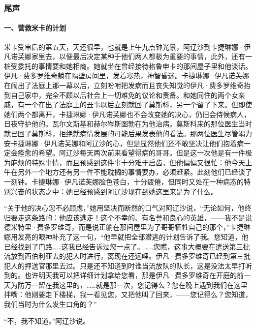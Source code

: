 \subsubsection*{尾声}

\paragraph*{一、营救米卡的计划}
\par 米卡受审后的第五天，天还很早，也就是上午九点钟光景，阿辽沙到卡捷琳娜·伊凡诺芙娜家里去，以便最后决定某种于他们两人都极为重要的事情，此外，还有一桩受委托的事情要和她相商。她就坐在曾经接待格鲁申卡的那间屋子里和他谈话。伊凡·费多罗维奇躺在隔壁房间里，发着寒热，神智昏迷。卡捷琳娜·伊凡诺芙娜在闹出了法庭上那一幕以后，立刻吩咐把发病而且丧失知觉的伊凡·费多罗维奇抬到自己家中，完全不顾以后社会上一切难免的议论和责备。和她同住的两个女亲戚，有一个在出了法庭上的丑事以后立刻就回了莫斯科，另一个留了下来。但即使她们两个都离开，卡捷琳娜·伊凡诺芙娜也不会改变她的决心，仍旧会侍候病人，日夜守护他的。瓦尔文斯基和赫尔岑斯图勃在为他治病。莫斯科来的那位医生当时就已回了莫斯科，拒绝就病情发展的可能后果发表他的看法。那两位医生尽管竭力安卡捷琳娜·伊凡诺芙娜和阿辽沙的心，但是显然他们还不敢坚决让他们抱着病一定会痊愈的希望。阿辽沙每天两次前来看望得病的哥哥。但是这一次他是有一件极为麻烦的特殊事情，而且预感到这件事十分难于启齿，但他偏偏又很忙：他今天上午在另外一个地方还有另一件不能耽搁的事情要办，必须赶紧。此刻他们已经谈了一刻钟。卡捷琳娜·伊凡诺芙娜脸色苍白，十分疲倦，但同时又处在一种病态的特别兴奋的状态之中：她已经预感到阿辽沙现在到她这里来是为了什么。
\par “关于他的决心您不必顾虑，”她用坚决而断然的口气对阿辽沙说，“无论如何，他终归要走这条路的：他应该逃走！这个不幸的、有名誉和良心的英雄，——我不是说德米特里·费多罗维奇，而是说正躺在那间屋里为了哥哥牺牲自己的那个，”卡捷琳娜用发亮的眼神补充了这一句，“他早就把全部潜逃的计划告诉了我。您知道，他已经找到了门路……这我已经告诉过您一点了。……您瞧，这事大概要在遣送第三批流放到西伯利亚去的犯人时进行，离现在还远哩。伊凡·费多罗维奇已经到第三批犯人的押送官那里去过。只是还不知道到时谁当流放队的队长，这是没法太早打听到的。也许明天我可以把详细计划拿给您看，那是伊凡·费多罗维奇在开庭的前一天为防万一留在我这里的，……就是那一次，您记得么？您在晚上遇到我们在这里拌嘴：他刚要走下楼梯，我一看见您，又把他叫了回来，——您记得么？您知道，我们当时为什么发生口角的？”
\par “不，我不知道。”阿辽沙说。
